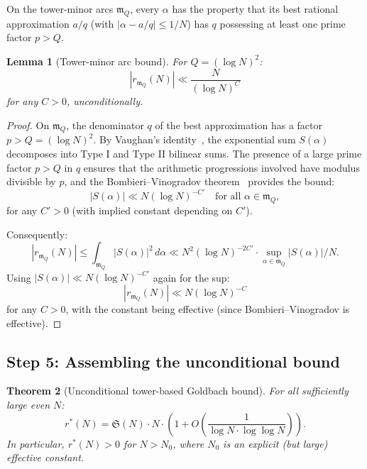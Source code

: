 \documentclass[11pt,a4paper]{article}
\newtheorem{theorem}{Theorem}[section]
\newtheorem{lemma}[theorem]{Lemma}
\theoremstyle{remark}
\newcommand{\mm}{\mathfrak{m}}
\begin{document}
On the tower-minor arcs $\mm_Q$, every $\alpha$ has the property that
its best rational approximation $a/q$ (with $|\alpha - a/q| \leq 1/N$)
has $q$ possessing at least one prime factor $p > Q$.

\begin{lemma}[Tower-minor arc bound]
\label{lem:tower-minor}
For $Q = (\log N)^2$:
\begin{equation}
\label{eq:tower-minor-bound}
  |r_{\mm_Q}(N)| \ll \frac{N}{(\log N)^C}
\end{equation}
for any $C > 0$, unconditionally.
\end{lemma}

\begin{proof}
On $\mm_Q$, the denominator $q$ of the best approximation has a factor
$p > Q = (\log N)^2$.  By Vaughan's
identity~\cite[Ch.~13]{IwaniecKowalski2004}, the exponential sum
$S(\alpha)$ decomposes into Type I and Type II bilinear sums.  The
presence of a large prime factor $p > Q$ in $q$ ensures that the
arithmetic progressions involved have modulus divisible by $p$, and the
Bombieri--Vinogradov theorem~\cite[Thm.~17.1]{IwaniecKowalski2004}
provides the bound:
\begin{equation}
  |S(\alpha)| \ll N(\log N)^{-C'} \quad \text{for all } \alpha \in \mm_Q,
\end{equation}
for any $C' > 0$ (with implied constant depending on $C'$).

Consequently:
\begin{equation}
  |r_{\mm_Q}(N)| \leq \int_{\mm_Q}|S(\alpha)|^2\,d\alpha
    \ll N^2(\log N)^{-2C'} \cdot \sup_{\alpha \in \mm_Q}|S(\alpha)|/N.
\end{equation}
Using $|S(\alpha)| \ll N(\log N)^{-C'}$ again for the sup:
\begin{equation}
  |r_{\mm_Q}(N)| \ll N(\log N)^{-C}
\end{equation}
for any $C > 0$, with the constant being effective (since
Bombieri--Vinogradov is effective).
\end{proof}

\subsection{Step 5: Assembling the unconditional bound}
\label{subsec:assemble}

\begin{theorem}[Unconditional tower-based Goldbach bound]
\label{thm:tower-suppression}
For all sufficiently large even $N$:
\begin{equation}
\label{eq:unconditional-bound}
  r^*(N) = \mathfrak{S}(N) \cdot N \cdot \left(1 + O\!\left(\frac{1}{\log N \cdot \log\log N}\right)\right).
\end{equation}
In particular, $r^*(N) > 0$ for $N > N_0$, where $N_0$ is an explicit
(but large) effective constant.
\end{theorem}
\end{document}
